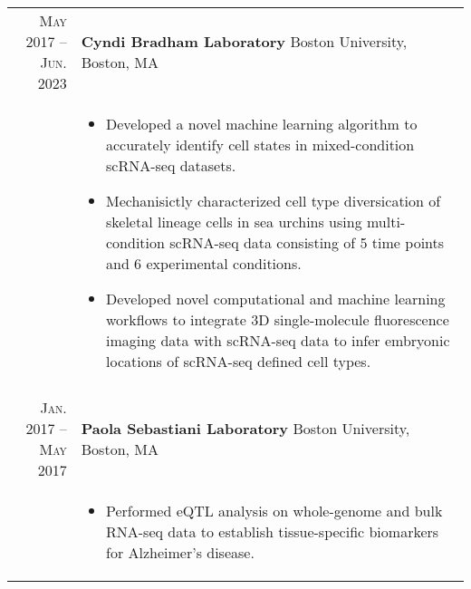 \documentclass[a4paper,10pt]{report}
\begin{document}
\section{\color{linkcolour}{Selected Research}}
\begin{longtable}{r|p{10cm}}
	\textsc{May 2017 -- Jun. 2023}   & \textbf{Cyndi Bradham Laboratory} Boston University, Boston, MA    \\
	                                 & \footnotesize{
		\vspace{-3.5mm}
		\begin{itemize}
			\setlength\itemsep{0em}
			\item Developed a novel machine learning algorithm to accurately identify cell states in mixed-condition scRNA-seq datasets.
			\item Mechanisictly characterized cell type diversication of skeletal lineage cells in sea urchins using multi-condition scRNA-seq data consisting of 5 time points and 6 experimental conditions.
			\item Developed novel computational and machine learning workflows to integrate 3D single-molecule fluorescence imaging data with scRNA-seq data to infer embryonic locations of scRNA-seq defined cell types.
		\end{itemize}
	} \vspace{-3.5mm}                                                                                     \\
	\multicolumn{2}{c}{}                                                                                  \\[-0.75em]
	\textsc{Jan. 2017 -- May 2017}   & \textbf{Paola Sebastiani Laboratory} Boston University, Boston, MA \\
	                                 & \footnotesize{
		\vspace{-3.5mm}
		\begin{itemize}
			\setlength\itemsep{0em}
			\item Performed eQTL analysis on whole-genome and bulk RNA-seq data to establish tissue-specific biomarkers for Alzheimer's disease.
		\end{itemize}
	} \vspace{-3.5mm}                                                                                     \\

\end{longtable}
\end{document}
